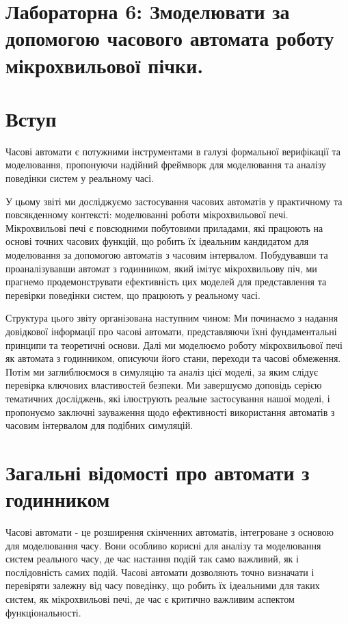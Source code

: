 \documentclass[12pt,a4paper]{article}
\begin{document}
\section*{Лабораторна 6: Змоделювати за допомогою часового автомата роботу мікрохвильової пічки. }

\section{Вступ}

Часові автомати є потужними інструментами в галузі формальної верифікації та моделювання, пропонуючи надійний фреймворк для моделювання та аналізу поведінки систем у реальному часі.

У цьому звіті ми досліджуємо застосування часових автоматів у практичному та повсякденному контексті: моделюванні роботи мікрохвильової печі. Мікрохвильові печі є повсюдними побутовими приладами, які працюють на основі точних часових функцій, що робить їх ідеальним кандидатом для моделювання за допомогою автоматів з часовим інтервалом. Побудувавши та проаналізувавши автомат з годинником, який імітує мікрохвильову піч, ми прагнемо продемонструвати ефективність цих моделей для представлення та перевірки поведінки систем, що працюють у реальному часі.

Структура цього звіту організована наступним чином: Ми починаємо з надання довідкової інформації про часові автомати, представляючи їхні фундаментальні принципи та теоретичні основи. Далі ми моделюємо роботу мікрохвильової печі як автомата з годинником, описуючи його стани, переходи та часові обмеження. Потім ми заглиблюємося в симуляцію та аналіз цієї моделі, за яким слідує перевірка ключових властивостей безпеки. Ми завершуємо доповідь серією тематичних досліджень, які ілюструють реальне застосування нашої моделі, і пропонуємо заключні зауваження щодо ефективності використання автоматів з часовим інтервалом для подібних симуляцій.

\section{Загальні відомості про автомати з годинником}

Часові автомати - це розширення скінченних автоматів, інтегроване з основою для моделювання часу. Вони особливо корисні для аналізу та моделювання систем реального часу, де час настання подій так само важливий, як і послідовність самих подій. Часові автомати дозволяють точно визначати і перевіряти залежну від часу поведінку, що робить їх ідеальними для таких систем, як мікрохвильові печі, де час є критично важливим аспектом функціональності.
\end{document}
